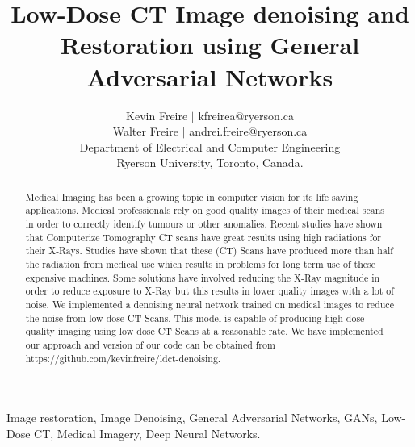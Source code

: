 \documentclass[journal]{IEEEtran}
\begin{document}
\title{Low-Dose CT Image denoising and Restoration using General Adversarial Networks}

\author{Kevin Freire $|$ kfreirea@ryerson.ca\\
Walter Freire $|$ andrei.freire@ryerson.ca \\
Department of Electrical and Computer Engineering\\
Ryerson University, Toronto, Canada.}
\maketitle

\begin{abstract}
Medical Imaging has been a growing topic in computer vision for its life saving applications.  Medical professionals rely on good quality images of their medical scans in order to correctly identify tumours or other anomalies.  Recent studies have shown that Computerize Tomography CT scans have great results using high radiations for their X-Rays.  Studies have shown that these (CT) Scans have produced more than half the radiation from medical use which results in problems for long term use of these expensive machines.  Some solutions have involved reducing the X-Ray magnitude in order to reduce exposure to X-Ray but this results in lower quality images with a lot of noise.  We implemented a denoising neural network trained on medical images to reduce the noise from low dose CT Scans.  This model is capable of producing high dose quality imaging using low dose CT Scans at a reasonable rate.  We have implemented our approach and version of our code can be obtained from https://github.com/kevinfreire/ldct-denoising.
\end{abstract}

\begin{IEEEkeywords}
Image restoration, Image Denoising, General Adversarial Networks, GANs, Low-Dose CT, Medical Imagery, Deep Neural Networks.
\end{IEEEkeywords}

\end{document}
